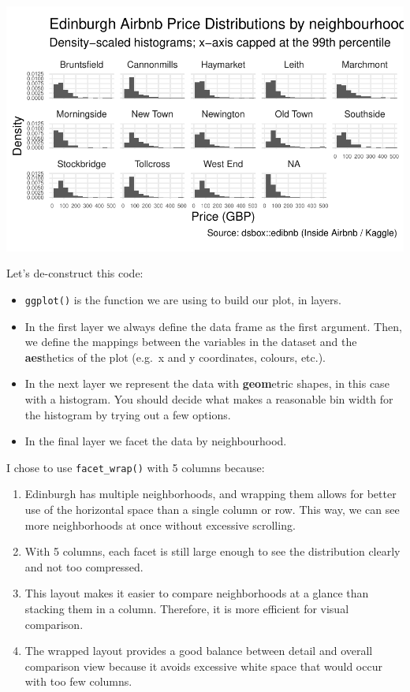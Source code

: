 \documentclass[
]{article}
\providecommand{\tightlist}{%
  \setlength{\itemsep}{0pt}\setlength{\parskip}{0pt}}
\begin{document}
\includegraphics[width=0.8\linewidth]{hw-02-airbnb-edi_files/figure-latex/unnamed-chunk-6-1}

Let's de-construct this code:

\begin{itemize}
\tightlist
\item
  \texttt{ggplot()} is the function we are using to build our plot, in
  layers.
\item
  In the first layer we always define the data frame as the first
  argument. Then, we define the mappings between the variables in the
  dataset and the \textbf{aes}thetics of the plot (e.g.~x and y
  coordinates, colours, etc.).
\item
  In the next layer we represent the data with \textbf{geom}etric
  shapes, in this case with a histogram. You should decide what makes a
  reasonable bin width for the histogram by trying out a few options.
\item
  In the final layer we facet the data by neighbourhood.
\end{itemize}

I chose to use \texttt{facet\_wrap()} with 5 columns because:

\begin{enumerate}
\def\labelenumi{\arabic{enumi}.}
\item
  Edinburgh has multiple neighborhoods, and wrapping them allows for
  better use of the horizontal space than a single column or row. This
  way, we can see more neighborhoods at once without excessive
  scrolling.
\item
  With 5 columns, each facet is still large enough to see the
  distribution clearly and not too compressed.
\item
  This layout makes it easier to compare neighborhoods at a glance than
  stacking them in a column. Therefore, it is more efficient for visual
  comparison.
\item
  The wrapped layout provides a good balance between detail and overall
  comparison view because it avoids excessive white space that would
  occur with too few columns.
\end{enumerate}
\end{document}
